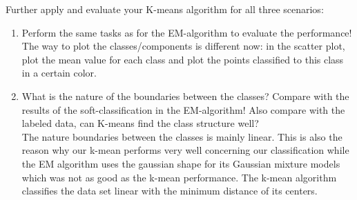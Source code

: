 \documentclass[a4paper]{article}
\begin{document}
Further apply and evaluate your K-means algorithm for all three scenarios:
\begin{enumerate}[resume]
\item Perform the same tasks as for the EM-algorithm to evaluate the performance! The way to plot the classes/components is different now: in the scatter plot, plot the mean value for each class and plot the points classified to this class in a certain color.

\item  What is the nature of the boundaries between the classes? Compare with the results of the soft-classification in the EM-algorithm! Also compare with the labeled data, can K-means find the class structure well? \\

The nature boundaries between the classes is mainly linear. This is also the reason why our k-mean performs very well concerning our classification while the EM algorithm uses the gaussian shape for its Gaussian mixture models which was not as good as the k-mean performance. The k-mean algorithm classifies the data set linear with the minimum distance of its centers.
\end{enumerate}

\newpage
\end{document}
